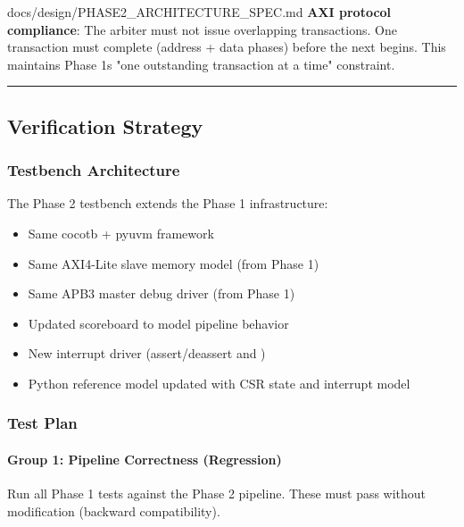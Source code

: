 \begin{relocated}{docs/design/PHASE2_ARCHITECTURE_SPEC.md}
\textbf{AXI protocol compliance}: The arbiter must not issue overlapping
transactions. One transaction must complete (address + data phases)
before the next begins. This maintains Phase 1\textquotesingle s "one
outstanding transaction at a time" constraint.

\begin{center}\rule{0.5\linewidth}{0.5pt}\end{center}

\subsection{Verification Strategy}\label{ds:ch:phase2-architecture:7-verification-strategy}

\subsubsection{Testbench Architecture}\label{ds:ch:phase2-architecture:71-testbench-architecture}

The Phase 2 testbench extends the Phase 1 infrastructure:

\begin{itemize}
\tightlist
\item
  Same cocotb + pyuvm framework
\item
  Same AXI4-Lite slave memory model (from Phase 1)
\item
  Same APB3 master debug driver (from Phase 1)
\item
  Updated scoreboard to model pipeline behavior
\item
  New interrupt driver (assert/\allowbreak{}deassert 
  and )
\item
  Python reference model updated with CSR state and interrupt model
\end{itemize}

\subsubsection{Test Plan}\label{ds:ch:phase2-architecture:72-test-plan}

\paragraph{Group 1: Pipeline Correctness (Regression)}\label{ds:ch:phase2-architecture:group-1-pipeline-correctness-regression}

Run all Phase 1 tests against the Phase 2 pipeline. These must pass
without modification (backward compatibility).


\end{relocated}
